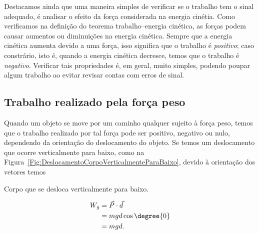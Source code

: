 Destacamos ainda que uma maneira simples de verificar se o trabalho tem o sinal adequado, é analisar o efeito da força considerada na energia cinétia. Como verificamos na definição do teorema trabalho--energia cinética, as forças podem causar aumentos ou diminuições na energia cinética. Sempre que a energia cinética aumenta devido a uma força, isso significa que o trabalho é \emph{positivo}; caso constrário, isto é, quando a energia cinética decresce, temos que o trabalho é \emph{negativo}. Verificar tais propriedades é, em geral, muito simples, podendo poupar algum trabalho ao evitar revisar contas com erros de sinal.

\subsection{Trabalho realizado pela força peso}

Quando um objeto se move por um caminho qualquer sujeito à força peso, temos que o trabalho realizado por tal força pode ser positivo, negativo ou nulo, dependendo da orientação do deslocamento do objeto. Se temos um deslocamento que ocorre verticalmente para baixo, como na Figura~\ref{Fig:DeslocamentoCorpoVerticalmenteParaBaixo}, devido à orientação dos vetores temos
\begin{marginfigure}[-5cm]
\centering
{}
\caption{Corpo que se desloca verticalmente para baixo. \label{Fig:DeslocamentoCorpoVerticalmenteParaBaixo}}
\end{marginfigure}
\begin{align}
  W_g &= \vec{P}\cdot\vec{d} \\
  &= mgd\cos\degree{0} \\
  &= mgd.
\end{align}


